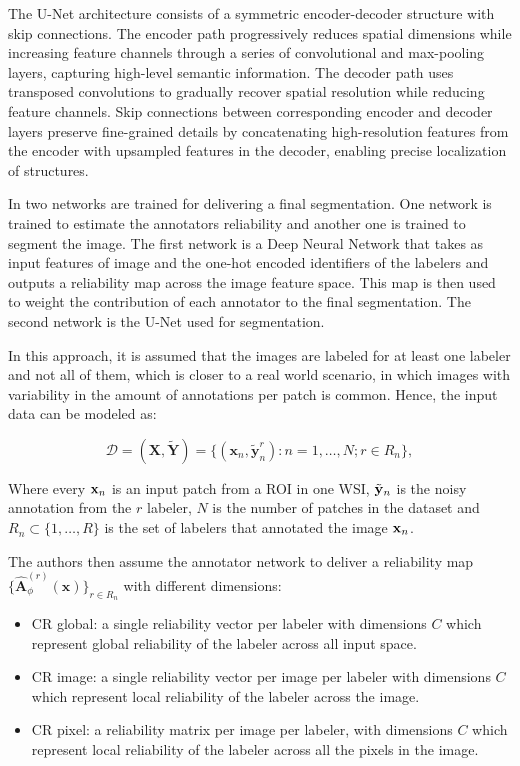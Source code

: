 The U-Net architecture consists of a symmetric encoder-decoder
structure with skip connections. The encoder path progressively
reduces spatial dimensions while increasing feature channels through
a series of convolutional and max-pooling layers, capturing
high-level semantic information. The decoder path uses transposed
convolutions to gradually recover spatial resolution while reducing
feature channels. Skip connections between corresponding encoder and
decoder layers preserve fine-grained details by concatenating
high-resolution features from the encoder with upsampled features in
the decoder, enabling precise localization of structures.

In \cite{LopezEtAl2024} two networks are trained for delivering a final
segmentation. One network is trained to estimate the annotators reliability
and another one is trained to segment the image. The
first network is a Deep Neural Network that takes as input features of
image and the one-hot encoded identifiers of the labelers and outputs
a reliability map across the image feature space. This map is then
used to weight the contribution of each annotator to the final segmentation.
The second network is the U-Net used for segmentation.

In this approach, it is assumed that the images are labeled for at least one
labeler and not all of them, which is closer to a real world scenario, in
which images with variability in the amount of annotations per patch
is common. Hence, the input data can be modeled as:

\begin{equation}
  \label{eq:input_data}
  \mathcal{D} = (\mathbf{X}, \tilde{\mathbf{Y}}) = \{ (\mathbf{x}_n,
  \tilde{\mathbf{y}}_n^r) : n = 1, \dots, N; r \in R_n \},
\end{equation}

Where every $\mathbf{x}_n$ is an input patch from a \gls{ROI} in one \gls{WSI},
$\tilde{\mathbf{y}}_n$ is the noisy annotation from the $r$ labeler, $N$
is the number of patches in the dataset and $R_n \subset \{1, \dots,
R\}$ is the set of labelers that annotated the image $\mathbf{x}_n$.

The authors then assume the annotator network to deliver a
reliability map $\{\hat{\mathbf{A}}^{(r)}_{\phi}(\mathbf{x}) \}_{r
\in R_n}$ with different dimensions:

\begin{itemize}
  \item \gls{CR} global: a single reliability vector per labeler with
    dimensions $C$ which represent global reliability of the labeler
    across all input space.
  \item \gls{CR} image: a single reliability vector per image per labeler
    with dimensions $C$ which represent local reliability of the labeler
    across the image.
  \item \gls{CR} pixel: a reliability matrix per image per labeler,
    with dimensions $C$ which represent local reliability of the labeler
    across all the pixels in the image.
\end{itemize}

